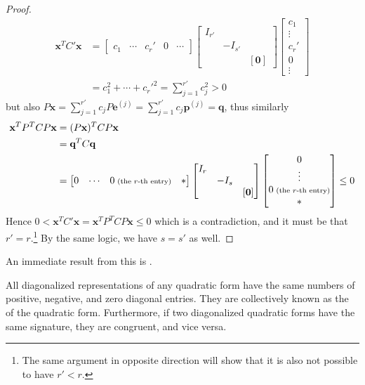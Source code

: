 \begin{proof}
\begin{align*}
\textbf{x}^T C'\textbf{x} &= 
\begin{bmatrix}
c_1 & \cdots & c_r' & 0 & \cdots  
\end{bmatrix}
\begin{bmatrix}
I_{r'} & & \\
& -I_{s'} &  \\
& & [\textbf{0}]
\end{bmatrix}
\begin{bmatrix}
c_1 \\
\vdots \\
c_r' \\
0 \\
\vdots
\end{bmatrix} \\
&= c_1^2 + \cdots + c_r'^2 = \sum_{j=1}^{r'} c_j^2 > 0   
\end{align*}
but also $P\textbf{x} = \sum_{j=1}^{r'} c_j P\textbf{e}^{(j)} = \sum_{j=1}^{r'} c_j \textbf{p}^{(j)} = \textbf{q}$, thus similarly
\begin{align*}
\textbf{x}^T P^T C P\textbf{x} &= (P\textbf{x})^T C P\textbf{x} \\
&= \textbf{q}^T C \textbf{q} \\
&= 
\begin{bmatrix}
0 & \cdots & 0 {\scriptsize \text{ (the $r$-th entry)}} & *
\end{bmatrix}
\begin{bmatrix}
I_r & & \\
& -I_s &  \\
& & [\textbf{0}]
\end{bmatrix}
\begin{bmatrix}
0 \\
\vdots \\
0 {\scriptsize \text{ (the $r$-th entry)}} \\
*
\end{bmatrix} \leq 0
\end{align*}
Hence $0 < \textbf{x}^T C'\textbf{x} = \textbf{x}^T P^T CP\textbf{x} \leq 0$ which is a contradiction, and it must be that $r' = r$.\footnote{The same argument in opposite direction will show that it is also not possible to have $r' < r$.} By the same logic, we have $s = s'$ as well.
\end{proof}
An immediate result from this is .
\begin{thm}
\label{thm:sylvester}
All diagonalized representations of any quadratic form have the same numbers of positive, negative, and zero diagonal entries. They are collectively known as the  of the quadratic form. Furthermore, if two diagonalized quadratic forms have the same signature, they are congruent, and vice versa.
\end{thm}
